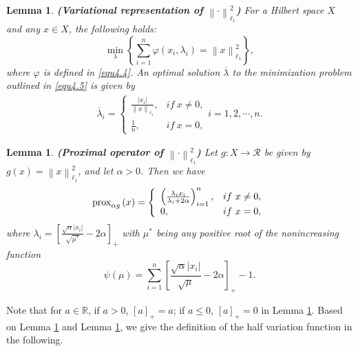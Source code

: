 \documentclass[a4paper,12pt]{article}
\newtheorem{lemma}[theorem]{Lemma}
\numberwithin{equation}{section}
\begin{document}
\begin{lemma}\label{lem4.3}
    \textbf{(Variational representation of $\left\|\cdot\right\|_{\ell_{1}}^{2}$)} For a Hilbert space $X$ and any $x\in X$, the following holds:
    \begin{equation}\label{equ4.5}
        \min_{\lambda}\left\{\sum_{i=1}^{n}\varphi\left(x_{i},\lambda_{i} \right)=\left\|x\right\|_{\ell_{1}}^{2}\right\},
    \end{equation}
    where $\varphi$ is defined in \eqref{equ4.4}. An optimal solution $\overline{\lambda}$ to the minimization problem outlined in \eqref{equ4.5} is given by
    \begin{align*}
        \overline{\lambda}_{i}=
        \left\{             
             \begin{array}{ll}
             \frac{\left|x_{i}\right|}{\left\|x\right\|_{\ell_{1}}}, & if \ x\neq 0, \\
             \frac{1}{n}, & if \ x=0,
             \end{array}
        \right.
        i=1,2,\cdots,n. 
    \end{align*}
\end{lemma}

\begin{lemma}\label{lem4.4}
    \textbf{(Proximal operator of $\left\|\cdot\right\|_{\ell_{1}}^{2}$)} Let $g:X\rightarrow \mathcal{R}$ be given by $g\left(x\right)=\left\|x\right\|_{\ell_{1}}^{2}$, and let $\alpha>0$. Then we have 
    \begin{equation*}
        {\rm prox}_{\alpha g}\left(x\right)=
        \left\{             
             \begin{array}{ll}
             \left(\frac{\lambda_{i}x_{i}}{\lambda_{i}+2\alpha}\right)_{i=1}^{n}, & if \ x\neq 0, \\
             0, & if \ x=0,
             \end{array}
        \right.
    \end{equation*}
    where $\lambda_{i}=\left[\frac{\sqrt{\alpha}\left|x_{i}\right|}{\sqrt{\mu^{*}}}-2\alpha\right]_{+}$ with $\mu^{*}$ being any positive root of the nonincreasing function 
    \begin{equation*}
        \psi\left(\mu\right)=\sum_{i=1}^{n}\left[\frac{\sqrt{\alpha}\left|x_{i}\right|} {\sqrt{\mu}}-2\alpha\right]_{+}-1.
    \end{equation*}
\end{lemma}

\par Note that for $a\in\mathbb{R}$, if $a>0$, $\left[a\right]_{+}=a$; if $a\leq 0$, $\left[a\right]_{+}=0$ in Lemma \ref{lem4.4}. Based on Lemma \ref{lem4.3} and Lemma \ref{lem4.4}, we give the definition of the half variation function in the following.
\end{document}
